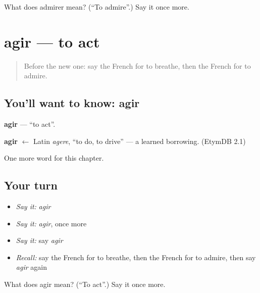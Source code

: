 \begin{tcolorbox}[breakable,colback=teal!4,colframe=teal!35!black,title={Before you move on}]
What does admirer mean? (\textquotedblleft{}To admire\textquotedblright{}.) Say it once more.
\end{tcolorbox}
\section[agir]{agir — to act}

\label{lesson:FR-C152-agir}



\begin{quote}
Before the new one: say the French for to breathe, then the French for to admire.
\end{quote}

\subsection*{You'll want to know: agir}
\textbf{agir} — \textquotedblleft{}to act\textquotedblright{}.

\begin{cousinweb}
\textbf{agir} $\leftarrow$ Latin \emph{agere}, \textquotedblleft{}to do, to drive\textquotedblright{} — a learned borrowing. (EtymDB 2.1)
\end{cousinweb}

\begin{grammarlens}[title={What you've built}]
One more word for this chapter.
\end{grammarlens}

\subsection*{Your turn}
\begin{itemize}
\raggedright
  \item \emph{Say it:} \emph{agir}
  \item \emph{Say it:} \emph{agir}, once more
  \item \emph{Say it:} say \emph{agir}
  \item \emph{Recall:} say the French for to breathe, then the French for to admire, then say \emph{agir} again
\end{itemize}

\begin{tcolorbox}[breakable,colback=teal!4,colframe=teal!35!black,title={Before you move on}]
What does agir mean? (\textquotedblleft{}To act\textquotedblright{}.) Say it once more.
\end{tcolorbox}
